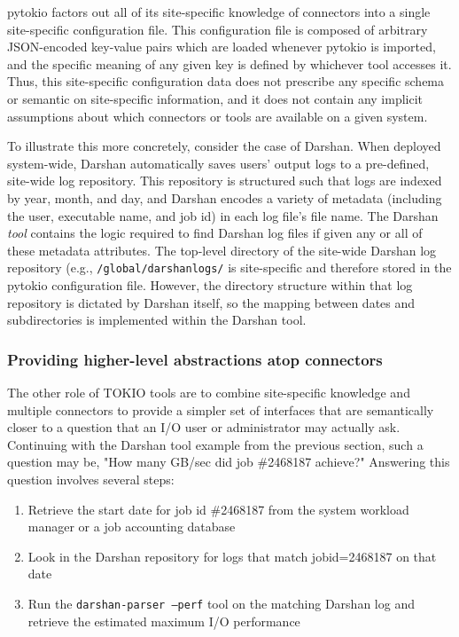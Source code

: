 pytokio factors out all of its site-specific knowledge of connectors into a single site-specific configuration file.
This configuration file is composed of arbitrary JSON-encoded key-value pairs which are loaded whenever pytokio is imported, and the specific meaning of any given key is defined by whichever tool accesses it.
Thus, this site-specific configuration data does not prescribe any specific schema or semantic on site-specific information, and it does not contain any implicit assumptions about which connectors or tools are available on a given system.

To illustrate this more concretely, consider the case of Darshan.
When deployed system-wide, Darshan automatically saves users' output logs to a pre-defined, site-wide log repository.
This repository is structured such that logs are indexed by year, month, and day, and Darshan encodes a variety of metadata (including the user, executable name, and job id) in each log file's file name.
The Darshan \emph{tool} contains the logic required to find Darshan log files if given any or all of these metadata attributes.
The top-level directory of the site-wide Darshan log repository (e.g., \texttt{{/global/darshanlogs/}} is site-specific and therefore stored in the pytokio configuration file.
However, the directory structure within that log repository is dictated by Darshan itself, so the mapping between dates and subdirectories is implemented within the Darshan tool.

\subsubsection{Providing higher-level abstractions atop connectors}

The other role of TOKIO tools are to combine site-specific knowledge and multiple connectors to provide a simpler set of interfaces that are semantically closer to a question that an I/O user or administrator may actually ask.
Continuing with the Darshan tool example from the previous section, such a question may be, "How many GB/sec did job \#2468187 achieve?"
Answering this question involves several steps:

\begin{enumerate}[leftmargin=*]
\item Retrieve the start date for job id \#2468187 from the system workload manager or a job accounting database
\item Look in the Darshan repository for logs that match jobid=2468187 on that date
\item Run the \texttt{darshan-parser --perf} tool on the matching Darshan log and retrieve the estimated maximum I/O performance
\end{enumerate}

